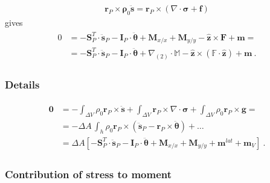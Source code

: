 \documentclass[letterpaper,10pt,english]{jupyterBook}
\begin{document}
\sphinxAtStartPar
{}
\begin{equation*}
\begin{split}\mathbf{r}_P \times \mathbf{\rho}_0 \ddot{\mathbf{s}} = \mathbf{r}_P \times \left( \nabla \cdot \boldsymbol\sigma + \mathbf{f} \right)\end{split}
\end{equation*}
\sphinxAtStartPar
gives
\begin{equation*}
\begin{split}\begin{aligned}
  0
  & = - \mathbf{S}_P^T \cdot \ddot{\mathbf{s}}_P - \mathbf{I}_{P} \cdot \ddot{\boldsymbol\theta} + \mathbf{M}_{x/x} + \mathbf{M}_{y/y} - \hat{\mathbf{z}} \times \mathbf{F} + \mathbf{m} = \\
  & = - \mathbf{S}_P^T \cdot \ddot{\mathbf{s}}_P - \mathbf{I}_{P} \cdot \ddot{\boldsymbol\theta} + \nabla_{(2)} \cdot \mathbb{M} - \hat{\mathbf{z}} \times \left( \mathbb{F} \cdot \hat{\mathbf{z}} \right) + \mathbf{m}  \ .
\end{aligned}\end{split}
\end{equation*}\subsubsection*{Details}
\begin{equation*}
\begin{split}\begin{aligned}
  \mathbf{0} 
& = - \int_{\Delta V} \rho_0 \mathbf{r}_P \times \ddot{\mathbf{s}} + \int_{\Delta V} \mathbf{r}_P \times \nabla \cdot \boldsymbol\sigma + \int_{\Delta V} \rho_0 \mathbf{r}_P \times \mathbf{g} = \\
& = - \Delta A \, \int_{h} \rho_0 \mathbf{r}_P \times \left( \ddot{\mathbf{s}}_P - \mathbf{r}_P \times \ddot{\boldsymbol{\theta}} \right)
    + \dots \\
& = \Delta A \left[ - \mathbf{S}_P^T \cdot \ddot{\mathbf{s}}_P - \mathbf{I}_{P} \cdot \ddot{\boldsymbol\theta} + \mathbf{M}_{x/x} + \mathbf{M}_{y/y} + \mathbf{m}^{lat} + \mathbf{m}_V \right] \ .
\end{aligned}\end{split}
\end{equation*}\subsubsection*{Contribution of stress to moment}
\end{document}
